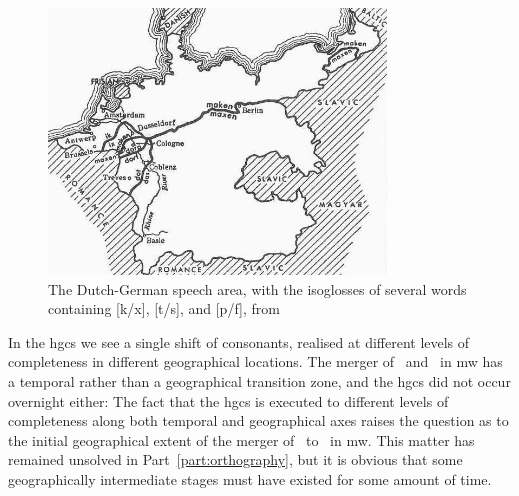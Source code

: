 \begin{figure}[h]
  \centering
  \includegraphics[width=0.8\textwidth]{3orth/images/hgcs.jpg}
  \caption[Bloomfield's isoglosses of the \acrshort{hgcs}.]{The Dutch-German speech area, with the isoglosses of several words containing [k/x], [t/s], and [p/f], from \textcite[344]{Blo_Language33}}
\label{fig:hgcsmap}
\end{figure}

In the \gls{hgcs} we see a single shift of consonants, realised at different levels of completeness in different geographical locations. The merger of \lT\ and \xD\ in \gls{mw} has a temporal rather than a geographical transition zone, and the \gls{hgcs} did not occur overnight either:
The fact that the \gls{hgcs} is executed to different levels of completeness along both temporal and geographical axes raises the question as to the initial geographical extent of the merger of \lT\ to \xD\ in \gls{mw}. This matter has remained unsolved in Part~\ref{part:orthography}, but it is obvious that some geographically intermediate stages must have existed for some amount of time.


